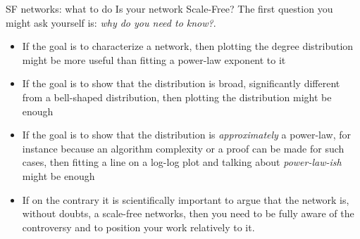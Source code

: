 

\begin{textbox}{SF networks: what to do}
    Is your network Scale-Free? The first question you might ask yourself is: \textit{why do you need to know?}.
    \begin{itemize}
        \item If the goal is to characterize a network, then plotting the degree distribution might be more useful than fitting a power-law exponent to it
        \item If the goal is to show that the distribution is broad, significantly different from a bell-shaped distribution, then plotting the distribution might be enough
        \item If the goal is to show that the distribution is \textit{approximately} a power-law, for instance because an algorithm complexity or a proof can be made for such cases, then fitting a line on a log-log plot and talking about \textit{power-law-ish} might be enough
        \item If on the contrary it is scientifically important to argue that the network is, without doubts, a scale-free networks, then you need to be fully aware of the controversy and to position your work relatively to it.
    \end{itemize}
\end{textbox}